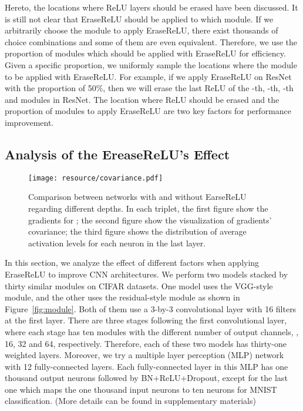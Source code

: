 \documentclass[10pt,twocolumn,letterpaper]{article}
\begin{document}
Hereto, the locations where ReLU layers should be erased have been discussed.
It is still not clear that EraseReLU should be applied to which module.
If we arbitrarily choose the module to apply EraseReLU, there exist thousands of choice combinations and some of them are even equivalent.
Therefore, we use the proportion of modules which should be applied with EraseReLU for efficiency.
Given a specific proportion, we uniformly sample the locations where the module to be applied with EraseReLU.
For example, if we apply EraseReLU on ResNet with the proportion of 50\%, then we will erase the last ReLU of the -th, -th, -th and \etc modules in ResNet.
The location where ReLU should be erased and the proportion of modules to apply EraseReLU are two key factors for performance improvement.


\subsection{Analysis of the EreaseReLU's Effect}\label{sec:effect}


\begin{figure*}[t]
\center
\texttt{[image: resource/covariance.pdf]}
\caption{Comparison between networks with and without EarseReLU regarding different depths.
In each triplet, the first figure show the gradients for ; the second figure show the visualization of gradients' covariance;
the third figure shows the distribution of average activation levels for each neuron in the last layer.
}
\label{fig:covariance}
\end{figure*}

In this section, we analyze the effect of different factors when applying EraseReLU to improve CNN architectures.
We perform two models stacked by thirty similar modules on CIFAR datasets.
One model uses the VGG-style module, and the other uses the residual-style module as shown in Figure~\ref{fig:module}.
Both of them use a 3-by-3 convolutional layer with 16 filters at the first layer. There are three stages following the first convolutional layer, where each stage has ten modules with the different number of output channels, \ie, 16, 32 and 64, respectively. Therefore, each of these two models has thirty-one weighted layers. Moreover, we try a multiple layer perception (MLP) network with 12 fully-connected layers. Each fully-connected layer in this MLP has one thousand output neurons followed by BN+ReLU+Dropout, except for the last one which maps the one thousand input neurons to ten neurons for MNIST classification. (More details can be found in supplementary materials)
\end{document}
